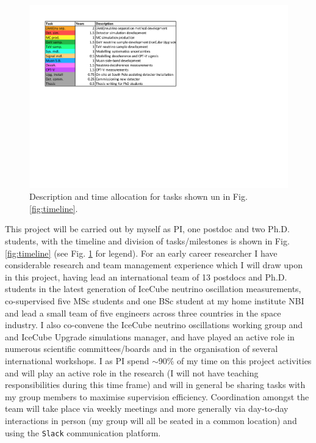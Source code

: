\documentclass[a4paper,11pt]{article}
\begin{document}
\begin{figure} %
    \centering
    \includegraphics[trim=1.7cm 11.5cm 12.3cm 1.0cm, clip=true, width=\linewidth]{images/TaskPlanningLegend.pdf}
    \caption{Description and time allocation for tasks shown un in Fig. \ref{fig:timeline}. }
    \label{fig:timeline_legend}
\end{figure}

This project will be carried out by myself as PI, one postdoc and two Ph.D. students, with the timeline and division of tasks/milestones is shown in Fig. \ref{fig:timeline} (see Fig. \ref{fig:timeline_legend} for legend). For an early career researcher I have considerable research and team management experience which I will draw upon in this project, having lead an international team of 13 postdocs and Ph.D. students in the latest generation of IceCube neutrino oscillation measurements, co-supervised five MSc students and one BSc student at my home institute NBI and lead a small team of five engineers across three countries in the space industry. I also co-convene the IceCube neutrino oscillations working group and and IceCube Upgrade simulations manager, and have played an active role in numerous scientific committees/boards and in the organisation of several international workshops. I as PI spend $\sim$90\% of my time on this project activities and will play an active role in the research (I will not have teaching responsibilities during this time frame) and will in general be sharing tasks with my group members to maximise supervision efficiency. Coordination amongst the team will take place via weekly meetings and more generally via day-to-day interactions in person (my group will all be seated in a common location) and using the \texttt{Slack} communication platform. 
\end{document}
